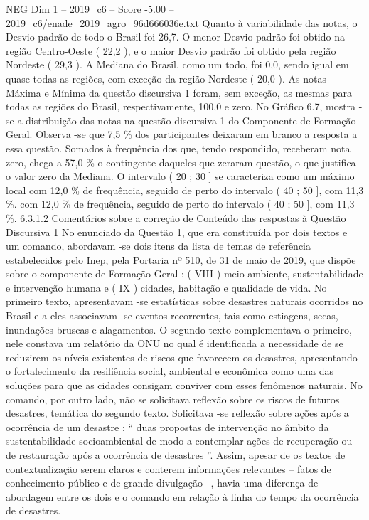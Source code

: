 \begin{textsample}{NEG Dim 1 – 2019\_c6 – Score -5.00 – 2019\_c6/enade\_2019\_agro\_96d666036e.txt}
Quanto à variabilidade das notas, o Desvio padrão de todo o Brasil foi 26,7.
O menor Desvio padrão foi obtido na região Centro-Oeste ( 22,2 ), e o maior Desvio padrão foi obtido pela região Nordeste ( 29,3 ).
A Mediana do Brasil, como um todo, foi 0,0, sendo igual em quase todas as regiões, com exceção da região Nordeste ( 20,0 ).
As notas Máxima e Mínima da questão discursiva 1 foram, sem exceção, as mesmas para todas as regiões do Brasil, respectivamente, 100,0 e zero.
No Gráfico 6.7, mostra -se a distribuição das notas na questão discursiva 1 do Componente de Formação Geral.
Observa -se que 7,5 \% dos participantes deixaram em branco a resposta a essa questão.
Somados à frequência dos que, tendo respondido, receberam nota zero, chega a 57,0 \% o contingente daqueles que zeraram questão, o que justifica o valor zero da Mediana.
O intervalo ( 20 ; 30 ] se caracteriza como um máximo local com 12,0 \% de frequência, seguido de perto do intervalo ( 40 ; 50 ], com 11,3 \%. com 12,0 \% de frequência, seguido de perto do intervalo ( 40 ; 50 ], com 11,3 \%. 6.3.1.2 Comentários sobre a correção de Conteúdo das respostas à Questão Discursiva 1 No enunciado da Questão 1, que era constituída por dois textos e um comando, abordavam -se dois itens da lista de temas de referência estabelecidos pelo Inep, pela Portaria nº 510, de 31 de maio de 2019, que dispõe sobre o componente de Formação Geral : ( VIII ) meio ambiente, sustentabilidade e intervenção humana e ( IX ) cidades, habitação e qualidade de vida.
No primeiro texto, apresentavam -se estatísticas sobre desastres naturais ocorridos no Brasil e a eles associavam -se eventos recorrentes, tais como estiagens, secas, inundações bruscas e alagamentos.
O segundo texto complementava o primeiro, nele constava um relatório da ONU no qual é identificada a necessidade de se reduzirem os níveis existentes de riscos que favorecem os desastres, apresentando o fortalecimento da resiliência social, ambiental e econômica como uma das soluções para que as cidades consigam conviver com esses fenômenos naturais.
No comando, por outro lado, não se solicitava reflexão sobre os riscos de futuros desastres, temática do segundo texto.
Solicitava -se reflexão sobre ações após a ocorrência de um desastre : “ duas propostas de intervenção no âmbito da sustentabilidade socioambiental de modo a contemplar ações de recuperação ou de restauração após a ocorrência de desastres ”.
Assim, apesar de os textos de contextualização serem claros e conterem informações relevantes – fatos de conhecimento público e de grande divulgação –, havia uma diferença de abordagem entre os dois e o comando em relação à linha do tempo da ocorrência de desastres.

\end{textsample}
